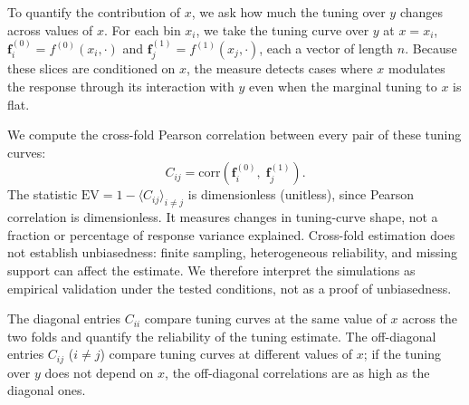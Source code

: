 \documentclass[11pt]{article}
\begin{document}
To quantify the contribution of $x$, we ask how much the tuning over $y$ changes across values of $x$. For each bin $x_i$, we take the tuning curve over $y$ at $x = x_i$, $\mathbf{f}^{(0)}_i = f^{(0)}(x_i, \cdot)$ and $\mathbf{f}^{(1)}_j = f^{(1)}(x_j, \cdot)$, each a vector of length $n$. Because these slices are conditioned on $x$, the measure detects cases where $x$ modulates the response through its interaction with $y$ even when the marginal tuning to $x$ is flat.

We compute the cross-fold Pearson correlation between every pair of these tuning curves:
\begin{equation}
C_{ij} = \mathrm{corr}\!\left(\mathbf{f}^{(0)}_i, \; \mathbf{f}^{(1)}_j\right).
\label{eq:1}
\end{equation}
The statistic $\mathrm{EV}=1-\langle C_{ij}\rangle_{i\ne j}$ is dimensionless (unitless), since Pearson correlation is dimensionless. It measures changes in tuning-curve shape, not a fraction or percentage of response variance explained. Cross-fold estimation does not establish unbiasedness: finite sampling, heterogeneous reliability, and missing support can affect the estimate. We therefore interpret the simulations as empirical validation under the tested conditions, not as a proof of unbiasedness.

The diagonal entries $C_{ii}$ compare tuning curves at the same value of $x$ across the two folds and quantify the reliability of the tuning estimate. The off-diagonal entries $C_{ij}$ ($i \neq j$) compare tuning curves at different values of $x$; if the tuning over $y$ does not depend on $x$, the off-diagonal correlations are as high as the diagonal ones.
\end{document}
